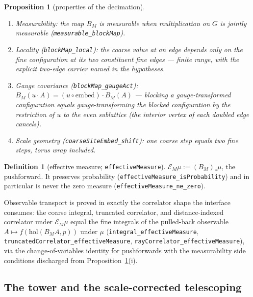 \documentclass[11pt]{article}
\newtheorem{proposition}[theorem]{Proposition}
\theoremstyle{definition}
\newtheorem{definition}[theorem]{Definition}
\newcommand{\lean}[1]{\texttt{#1}}
\newcommand{\holo}{\mathrm{hol}}
\begin{document}
\begin{proposition}[properties of the decimation]\label{prop:blockmap}
\begin{enumerate}
\item[(i)] \emph{Measurability}: the map $B_M$ is measurable when
multiplication on $G$ is jointly measurable
(\lean{measurable\_blockMap}).
\item[(ii)] \emph{Locality} (\lean{blockMap\_local}): the coarse value
at an edge depends only on the fine configuration at its two
constituent fine edges --- finite range, with the explicit two-edge
carrier named in the hypotheses.
\item[(iii)] \emph{Gauge covariance} (\lean{blockMap\_gaugeAct}):
$B_M(u \cdot A) = (u \circ \mathrm{embed}) \cdot B_M(A)$ --- blocking a
gauge-transformed configuration equals gauge-transforming the blocked
configuration by the restriction of $u$ to the even sublattice (the
interior vertex of each doubled edge cancels).
\item[(iv)] \emph{Scale geometry} (\lean{coarseSiteEmbed\_shift}): one
coarse step equals two fine steps, torus wrap included.
\end{enumerate}
\end{proposition}

\begin{definition}[effective measure; \lean{effectiveMeasure}]
$\mathcal{E}_M \mu := (B_M)_* \mu$, the pushforward.  It preserves
probability (\lean{effectiveMeasure\_isProbability}) and in particular
is never the zero measure (\lean{effectiveMeasure\_ne\_zero}).
\end{definition}

Observable transport is proved in exactly the correlator shape the
interface consumes: the coarse integral, truncated correlator, and
distance-indexed correlator under $\mathcal{E}_M \mu$ equal the fine
integrals of the pulled-back observable
$A \mapsto f(\holo(B_M A, p))$ under $\mu$
(\lean{integral\_effectiveMeasure},
\lean{truncatedCorrelator\_effectiveMeasure},
\lean{rayCorrelator\_effectiveMeasure}), via the change-of-variables
identity for pushforwards with the measurability side conditions
discharged from Proposition~\ref{prop:blockmap}(i).

\subsection{The tower and the scale-corrected telescoping}
\label{sec:rg:tower}
\end{document}
